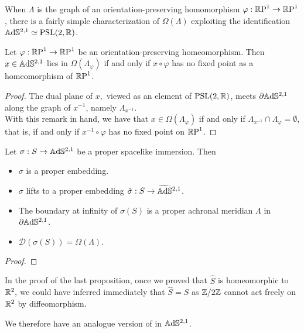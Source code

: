 When $\Lambda$ is the graph of an orientation-preserving homomorphism $\varphi:\S\to\S$, there is a fairly simple characterization of $\Omega(\Lambda)$ exploiting the identification $\A^{2,1}\simeq \PSL$.


\begin{corollary}\label{454}
    Let $\varphi:\S\to\S$ be an orientation-preserving homeomorphism. Then $x\in\A^{2,1}$ lies in $\Omega(\Lambda_\varphi)$ if and only if $x\circ\varphi$ has no fixed point as a homeomorphism of $\S$.
\end{corollary}
\begin{proof}
    The dual plane of $x,$ viewed as an element of $\PSL$, meets $\partial\A^{2,1}$ along the graph of $x^{-1}$, namely $\Lambda_{x^{-1}}$.\\
    With this remark in hand, we have that $x\in\Omega(\Lambda_\varphi)$ if and only if $\Lambda_{x^{-1}}\cap \Lambda_\varphi=\emptyset$, that is, if and only if $x^{-1}\circ\varphi$ has no fixed point on $\S$.

\end{proof}

\begin{proposition}
    Let $\sigma: S\to\A^{2,1}$ be a proper spacelike immersion. Then 
    \begin{itemize}
        \item $\sigma$ is a proper embedding.
        \item $\sigma$ lifts to a proper embedding $\tilde{\sigma}:S\to\AS^{2,1}$.
        \item The boundary at infinity of $\sigma(S)$ is a proper achronal meridian $\Lambda$ in $\partial\A^{2,1}$.
        \item $\mathcal{D}(\sigma(S))=\Omega(\Lambda).$
    \end{itemize}
\end{proposition}

\begin{proof}
\end{proof}

\begin{observation}
    In the proof of the last proposition, once we proved that $\hat{S}$ is homeomorphic to $\R^2,$ we could have inferred immediately that $\hat{S}=S$ as $\Z/2\Z$ cannot act freely on $\R^2$ by diffeomorphism. 
\end{observation}

We therefore have an analogue version of  in $\A^{2,1}$.


